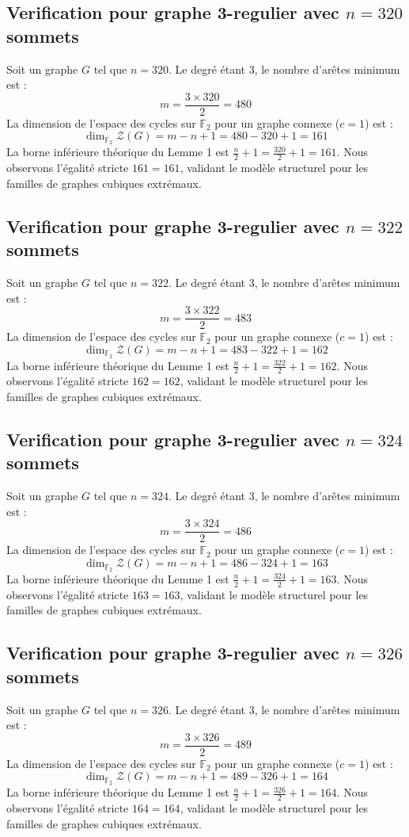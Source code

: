 \documentclass[11pt,a4paper]{article}
\begin{document}
\subsection{Verification pour graphe 3-regulier avec $n=320$ sommets}
Soit un graphe $G$ tel que $n = 320$. Le degré étant 3, le nombre d'arêtes minimum est :
$$ m = \frac{3 \times 320}{2} = 480 $$
La dimension de l'espace des cycles sur $\mathbb{F}_2$ pour un graphe connexe ($c=1$) est :
$$ \dim_{\mathbb{F}_2} \mathcal{Z}(G) = m - n + 1 = 480 - 320 + 1 = 161 $$
La borne inférieure théorique du Lemme 1 est $\frac{n}{2} + 1 = \frac{320}{2} + 1 = 161$.
Nous observons l'égalité stricte $161 = 161$, validant le modèle structurel pour les familles de graphes cubiques extrémaux.

\subsection{Verification pour graphe 3-regulier avec $n=322$ sommets}
Soit un graphe $G$ tel que $n = 322$. Le degré étant 3, le nombre d'arêtes minimum est :
$$ m = \frac{3 \times 322}{2} = 483 $$
La dimension de l'espace des cycles sur $\mathbb{F}_2$ pour un graphe connexe ($c=1$) est :
$$ \dim_{\mathbb{F}_2} \mathcal{Z}(G) = m - n + 1 = 483 - 322 + 1 = 162 $$
La borne inférieure théorique du Lemme 1 est $\frac{n}{2} + 1 = \frac{322}{2} + 1 = 162$.
Nous observons l'égalité stricte $162 = 162$, validant le modèle structurel pour les familles de graphes cubiques extrémaux.

\subsection{Verification pour graphe 3-regulier avec $n=324$ sommets}
Soit un graphe $G$ tel que $n = 324$. Le degré étant 3, le nombre d'arêtes minimum est :
$$ m = \frac{3 \times 324}{2} = 486 $$
La dimension de l'espace des cycles sur $\mathbb{F}_2$ pour un graphe connexe ($c=1$) est :
$$ \dim_{\mathbb{F}_2} \mathcal{Z}(G) = m - n + 1 = 486 - 324 + 1 = 163 $$
La borne inférieure théorique du Lemme 1 est $\frac{n}{2} + 1 = \frac{324}{2} + 1 = 163$.
Nous observons l'égalité stricte $163 = 163$, validant le modèle structurel pour les familles de graphes cubiques extrémaux.

\subsection{Verification pour graphe 3-regulier avec $n=326$ sommets}
Soit un graphe $G$ tel que $n = 326$. Le degré étant 3, le nombre d'arêtes minimum est :
$$ m = \frac{3 \times 326}{2} = 489 $$
La dimension de l'espace des cycles sur $\mathbb{F}_2$ pour un graphe connexe ($c=1$) est :
$$ \dim_{\mathbb{F}_2} \mathcal{Z}(G) = m - n + 1 = 489 - 326 + 1 = 164 $$
La borne inférieure théorique du Lemme 1 est $\frac{n}{2} + 1 = \frac{326}{2} + 1 = 164$.
Nous observons l'égalité stricte $164 = 164$, validant le modèle structurel pour les familles de graphes cubiques extrémaux.
\end{document}
